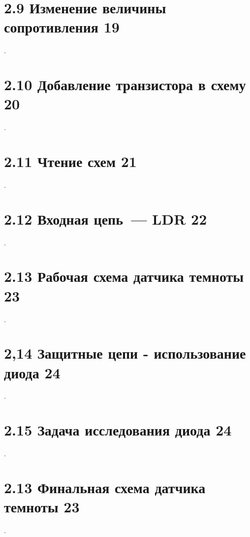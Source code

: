 \section{2.9 Изменение величины сопротивления 19}

.

\section{2.10 Добавление транзистора в схему 20}

.

\section{2.11 Чтение схем 21}

.

\section{2.12 Входная цепь\ --- LDR 22}

.

\section{2.13 Рабочая схема датчика темноты 23}

.

\section{2,14 Защитные цепи - использование диода 24}

.

\section{2.15 Задача исследования диода 24}

.

\section{2.13 Финальная схема датчика темноты 23}

.

